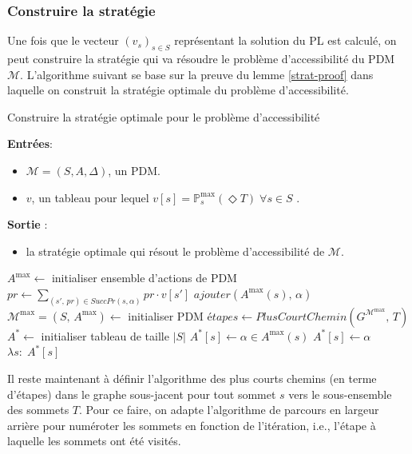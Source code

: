 \documentclass[12pt,a4paper]{report}
\theoremstyle{definition}%
\theoremstyle{remark}
\newcommand{\pr}{\mathbb{P}}
\let\labelitemi\labelitemii
\begin{document}
\subsubsection*{Construire la stratégie}
Une fois que le vecteur $(v_s)_{s \in S}$ représentant la solution du PL
est calculé, on peut construire la stratégie qui va résoudre le problème
d'accessibilité du PDM $\mathcal{M}$. L'algorithme suivant se base sur la preuve du lemme \ref{strat-proof} dans laquelle on construit la stratégie
optimale du problème d'accessibilité.

\begin{algorithm}[H]
\caption{Construire la stratégie optimale pour le problème d'accessibilité}
\hspace*{\algorithmicindent} \textbf{Entrées}:
	\begin{itemize}
		\renewcommand{\labelitemi}{\tiny$\bullet$}
		\item $\mathcal{M} = (S, A, \Delta)$, un PDM.
		\item $v$, un tableau pour lequel $v[s] = \pr^{\max}_s(\Diamond T) \; \forall s \in S$ .
	\end{itemize}
\hspace*{\algorithmicindent} \textbf{Sortie} :
\begin{itemize}
	\renewcommand{\labelitemi}{\tiny$\bullet$}
	\item la stratégie optimale qui résout le problème d'accessibilité de $\mathcal{M}$.
\end{itemize}
\begin{algorithmic}[1]
\STATE $A^{\max} \gets$ initialiser ensemble d'actions de PDM
		\STATE $pr \gets \sum_{(s', \,pr) \in SuccPr(s, \alpha)} pr \cdot v[s']$
			\STATE $ajouter(A^{\max}(s), \, \alpha)$
		\ENDIF
	\ENDFOR
\ENDFOR
\STATE $\mathcal{M}^{\max} = (S,\, A^{\max}) \gets $ initialiser PDM
\STATE $\textit{étapes} \gets PlusCourtChemin(G^{\mathcal{M}^{\max}},\, T)$
\STATE $A^* \gets$ initialiser tableau de taille $|S|$
	\STATE $A^*[s] \gets \alpha \in A^{\max}(s)$
				\STATE $A^*[s] \gets \alpha$
			\ENDIF
		\ENDFOR
	\ENDFOR
\ENDFOR
\RETURN $\lambda s: \; A^*[s]$
\end{algorithmic}
\end{algorithm}

Il reste maintenant à définir l'algorithme des plus courts chemins (en terme d'étapes) dans le
graphe sous-jacent pour tout sommet $s$ vers le sous-ensemble des sommets
$T$. Pour ce faire, on adapte l'algorithme de parcours en largeur arrière pour
numéroter les sommets en fonction de l'itération, i.e., l'étape à laquelle les sommets ont été visités.
\end{document}
